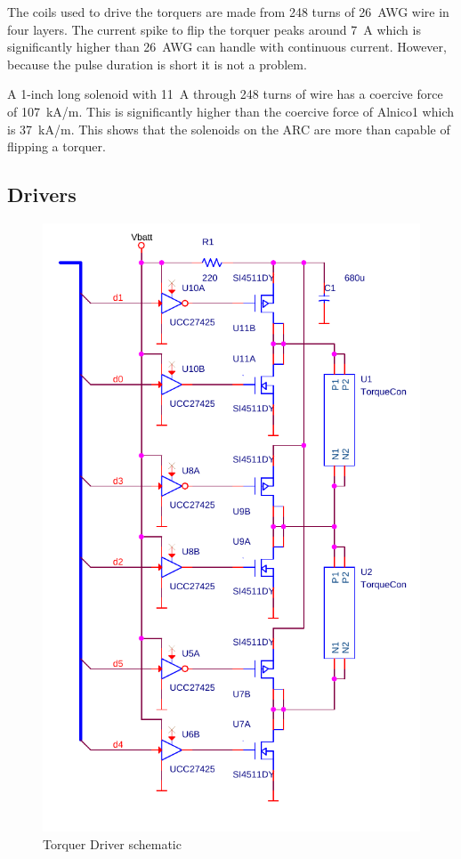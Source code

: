The coils used to drive the torquers are made from 248 turns of 26~AWG wire in four layers. The current spike to flip the torquer peaks around 7~A which is significantly higher than 26~AWG can handle with continuous current. However, because the pulse duration is short it is not a problem.


A 1-inch long solenoid with 11~A through 248 turns of wire has a coercive force of 107~kA/m. This is significantly higher than the coercive force of Alnico1 which is 37~kA/m\cite{AlnicoProp}. This shows that the solenoids on the \ac{ARC} are more than capable of flipping a torquer.

\subsection{Drivers}

\begin{figure}[htb!]
    \centering
    \includegraphics[height=0.5\textheight]{Figures/driverSchematic}
    \caption{Torquer Driver schematic}
    \label{fig:drive}
\end{figure}

